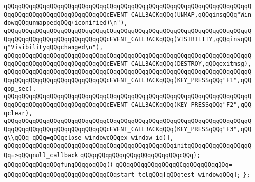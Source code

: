 \verb|qQQqqQQqqQQqqQQqqQQqqQQqqQQqqQQqqQQqqQQqqQQqqQQqqQQqqQQqqQQqqQQqqQQqqQQqqQQqqQQqqQQqqQQqqQQqqQQqqQQqEVENT_CALLBACKqQQq(UNMAP,qQQqinsqQQq"WindowqQQqunmappedqQQq(iconified)\n"),|\newline
\verb|qQQqqQQqqQQqqQQqqQQqqQQqqQQqqQQqqQQqqQQqqQQqqQQqqQQqqQQqqQQqqQQqqQQqqQQqqQQqqQQqqQQqqQQqqQQqqQQqqQQqEVENT_CALLBACKqQQq(VISIBILITY,qQQqinsqQQq"VisibilityqQQqchanged\n"),|\newline
\verb|qQQqqQQqqQQqqQQqqQQqqQQqqQQqqQQqqQQqqQQqqQQqqQQqqQQqqQQqqQQqqQQqqQQqqQQqqQQqqQQqqQQqqQQqqQQqqQQqqQQqEVENT_CALLBACKqQQq(DESTROY,qQQqexitmsg),|\newline
\verb|qQQqqQQqqQQqqQQqqQQqqQQqqQQqqQQqqQQqqQQqqQQqqQQqqQQqqQQqqQQqqQQqqQQqqQQqqQQqqQQqqQQqqQQqqQQqqQQqqQQqEVENT_CALLBACKqQQq(KEY_PRESSqQQq"F1",qQQqop_sec),|\newline
\verb|qQQqqQQqqQQqqQQqqQQqqQQqqQQqqQQqqQQqqQQqqQQqqQQqqQQqqQQqqQQqqQQqqQQqqQQqqQQqqQQqqQQqqQQqqQQqqQQqqQQqEVENT_CALLBACKqQQq(KEY_PRESSqQQq"F2",qQQqclear),|\newline
\verb|qQQqqQQqqQQqqQQqqQQqqQQqqQQqqQQqqQQqqQQqqQQqqQQqqQQqqQQqqQQqqQQqqQQqqQQqqQQqqQQqqQQqqQQqqQQqqQQqqQQqEVENT_CALLBACKqQQq(KEY_PRESSqQQq"F3",qQQq\\qQQq_qQQq=qQQqclose_windowqQQqex_window_id)],|\newline
\verb|qQQqqQQqqQQqqQQqqQQqqQQqqQQqqQQqqQQqqQQqqQQqqQQqinitqQQqqQQqqQQqqQQqqQQq=>qQQqnull_callback|\newline
\verb|qQQqqQQqqQQqqQQqqQQqqQQqqQQqqQQq};|\newline
\newline
\verb|qQQqqQQqqQQqqQQqfunqQQqgoqQQq()|\newline
\verb|qQQqqQQqqQQqqQQqqQQqqQQqqQQqqQQq=|\newline
\verb|qQQqqQQqqQQqqQQqqQQqqQQqqQQqqQQqstart_tclqQQq[qQQqtest_windowqQQq];|\newline
\verb|};|\newline
\newline

